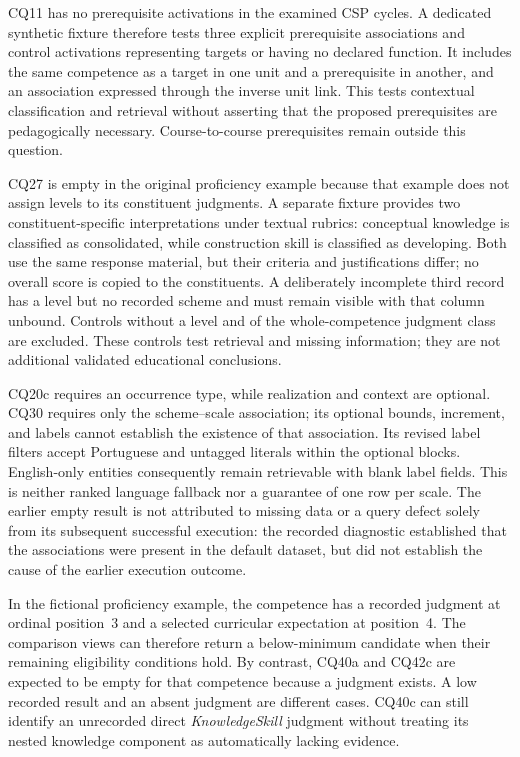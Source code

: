 CQ11 has no prerequisite activations in the examined CSP cycles. A
dedicated synthetic fixture therefore tests three explicit prerequisite
associations and control activations representing targets or having
no declared function. It includes the same competence as a target in
one unit and a prerequisite in another, and an association expressed
through the inverse unit link. This tests contextual classification
and retrieval without asserting that the proposed prerequisites are
pedagogically necessary. Course-to-course prerequisites remain outside
this question.

CQ27 is empty in the original proficiency example because that example
does not assign levels to its constituent judgments. A separate fixture
provides two constituent-specific interpretations under textual rubrics:
conceptual knowledge is classified as consolidated, while construction
skill is classified as developing. Both use the same response material,
but their criteria and justifications differ; no overall score is copied
to the constituents. A deliberately incomplete third record has a level
but no recorded scheme and must remain visible with that column unbound.
Controls without a level and of the whole-competence judgment class are
excluded. These controls test retrieval and missing information; they
are not additional validated educational conclusions.

CQ20c requires an occurrence type, while realization and context are
optional. CQ30 requires only the scheme--scale association; its optional
bounds, increment, and labels cannot establish the existence of that
association. Its revised label filters accept Portuguese and untagged
literals within the optional blocks. English-only entities consequently
remain retrievable with blank label fields. This is neither ranked
language fallback nor a guarantee of one row per scale. The earlier
empty result is not attributed to missing data or a query defect solely
from its subsequent successful execution: the recorded diagnostic
established that the associations were present in the default dataset,
but did not establish the cause of the earlier execution outcome.

In the fictional proficiency example, the competence has a recorded
judgment at ordinal position~3 and a selected curricular expectation
at position~4. The comparison views can therefore return a below-minimum
candidate when their remaining eligibility conditions hold. By contrast,
CQ40a and CQ42c are expected to be empty for that competence because a
judgment exists. A low recorded result and an absent judgment are
different cases. CQ40c can still identify an unrecorded direct
\textit{KnowledgeSkill} judgment without treating its nested knowledge
component as automatically lacking evidence.

